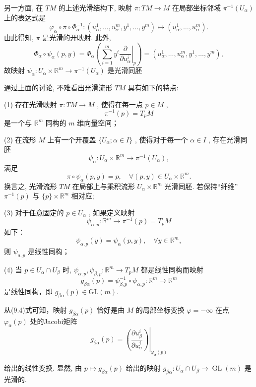 另一方面, 在  $TM$  的上述光滑结构下, 映射  $\pi: TM \to M$  在局部坐标邻域  $\pi^{-1}(U_{\alpha})$  上的表达式是
$$
\varphi_ {\alpha} \circ \pi \circ \Phi_ {\alpha} ^ {- 1}: \left(u _ {\alpha} ^ {1}, \dots , u _ {\alpha} ^ {m}, y ^ {1}, \dots , y ^ {m}\right) \mapsto \left(u _ {\alpha} ^ {1}, \dots , u _ {\alpha} ^ {m}\right).
$$
由此得知,  $\pi$  是光滑的开映射. 此外,
$$
\Phi_ {\alpha} \circ \psi_ {\alpha} (p, y) = \Phi_ {\alpha} \left(\sum_ {i = 1} ^ {m} y ^ {i} \left. \frac {\partial}{\partial u _ {\alpha} ^ {i}} \right| _ {p}\right) = \left(u _ {\alpha} ^ {1}, \dots , u _ {\alpha} ^ {m}, y ^ {1}, \dots , y ^ {m}\right),
$$
故映射  $\psi_{\alpha}:U_{\alpha}\times \mathbb{R}^{m}\to \pi^{-1}(U_{\alpha})$  是光滑同胚

通过上面的讨论, 不难看出光滑流形  $TM$  具有如下的特点:

(1) 存在光滑映射  $\pi: TM \to M$ , 使得在每一点  $p \in M$ ,
$$
\pi^ {- 1} (p) = T _ {p} M
$$
是一个与  $\mathbb{R}^m$  同构的  $m$  维向量空间；

(2) 在流形  $M$  上有一个开覆盖  $\{U_{\alpha}; \alpha \in I\}$ , 使得对于每一个  $\alpha \in I$ , 存在光滑同胚
$$
\psi_ {\alpha}: U _ {\alpha} \times \mathbb {R} ^ {m} \rightarrow \pi^ {- 1} (U _ {\alpha}),
$$
满足
$$
\pi \circ \psi_ {\alpha} (p, y) = p, \quad \forall (p, y) \in U _ {\alpha} \times \mathbb {R} ^ {m}.
$$
换言之, 光滑流形  $TM$  在局部上与乘积流形  $U_{\alpha} \times \mathbb{R}^{m}$  光滑同胚. 若保持“纤维”  $\pi^{-1}(p)$  与  $\{p\} \times \mathbb{R}^{m}$  相对应;

(3) 对于任意固定的  $p \in U_{\alpha}$ , 如果定义映射
$$
\psi_ {\alpha , p}: \mathbb {R} ^ {m} \rightarrow \pi^ {- 1} (p) = T _ {p} M
$$
如下：
$$
\psi_ {\alpha , p} (y) = \psi_ {\alpha} (p, y), \quad \forall y \in \mathbb {R} ^ {m},
$$
则  $\psi_{a,p}$  是线性同构；

(4) 当  $p \in U_{\alpha} \cap U_{\beta}$  时,  $\psi_{\alpha,p}, \psi_{\beta,p}: \mathbb{R}^{m} \to T_{p}M$  都是线性同构而映射
$$
g _ {\beta \alpha} (p) = \psi_ {\beta , p} ^ {- 1} \circ \psi_ {\alpha , p}: \mathbb {R} ^ {m} \rightarrow \mathbb {R} ^ {m}
$$
是线性同构，即  $g_{\beta \alpha}(p)\in \mathrm{GL}(m).$

从(9.4)式可知，映射  $g_{\beta \alpha}(p)$  恰好是由  $M$  的局部坐标变换  $\varphi = -\infty$  在点  $\varphi_{\alpha}(p)$  处的Jacobi矩阵
$$
g _ {\beta \alpha} (p) = \left. \left(\frac {\partial u _ {\beta} ^ {i}}{\partial u _ {\alpha} ^ {j}}\right) \right| _ {\varphi_ {\sigma} (p)}
$$

给出的线性变换. 显然, 由  $p \mapsto g_{\beta \alpha}(p)$  给出的映射  $g_{\beta \alpha}: U_{\alpha} \cap U_{\beta} \to \operatorname{GL}(m)$  是光滑的.


